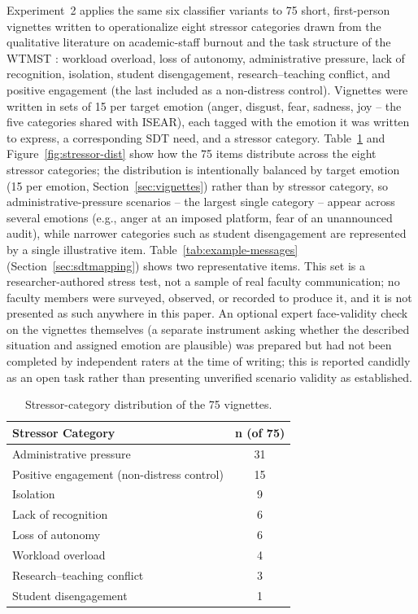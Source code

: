 \documentclass[higheredu,article,submit,pdftex,moreauthors]{Definitions/mdpi}
\begin{document}
Experiment~2 applies the same six classifier variants to 75 short, first-person vignettes written to operationalize eight stressor categories drawn from the qualitative literature on academic-staff burnout \cite{watts2011} and the task structure of the WTMST \cite{fernet2008}: workload overload, loss of autonomy, administrative pressure, lack of recognition, isolation, student disengagement, research--teaching conflict, and positive engagement (the last included as a non-distress control). Vignettes were written in sets of 15 per target emotion (anger, disgust, fear, sadness, joy -- the five categories shared with ISEAR), each tagged with the emotion it was written to express, a corresponding SDT need, and a stressor category. Table~\ref{tab:stressor-dist} and Figure~\ref{fig:stressor-dist} show how the 75 items distribute across the eight stressor categories; the distribution is intentionally balanced by target emotion (15 per emotion, Section~\ref{sec:vignettes}) rather than by stressor category, so administrative-pressure scenarios -- the largest single category -- appear across several emotions (e.g., anger at an imposed platform, fear of an unannounced audit), while narrower categories such as student disengagement are represented by a single illustrative item. Table~\ref{tab:example-messages} (Section~\ref{sec:sdtmapping}) shows two representative items. This set is a researcher-authored stress test, not a sample of real faculty communication; no faculty members were surveyed, observed, or recorded to produce it, and it is not presented as such anywhere in this paper. An optional expert face-validity check on the vignettes themselves (a separate instrument asking whether the described situation and assigned emotion are plausible) was prepared but had not been completed by independent raters at the time of writing; this is reported candidly as an open task rather than presenting unverified scenario validity as established.

\begin{table}[H]
\caption{Stressor-category distribution of the 75 vignettes.\label{tab:stressor-dist}}
\begin{tabularx}{\textwidth}{Xc}
\toprule
\textbf{Stressor Category} & \textbf{n (of 75)} \\
\midrule
Administrative pressure & 31 \\
Positive engagement (non-distress control) & 15 \\
Isolation & 9 \\
Lack of recognition & 6 \\
Loss of autonomy & 6 \\
Workload overload & 4 \\
Research--teaching conflict & 3 \\
Student disengagement & 1 \\
\bottomrule
\end{tabularx}
\end{table}
\end{document}
